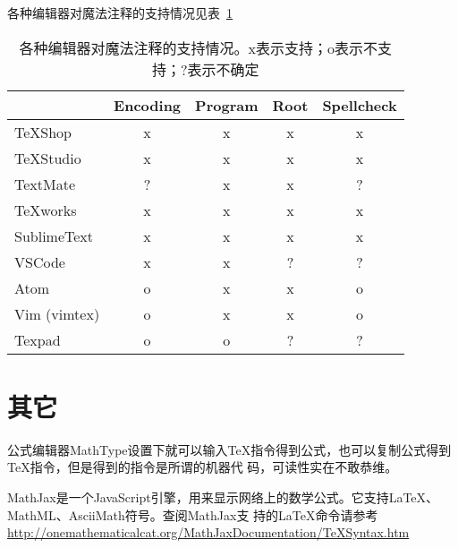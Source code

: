 各种编辑器对魔法注释的支持情况见表~\ref{magiccommands}
\begin{table}
  \centering
  \caption{各种编辑器对魔法注释的支持情况。x表示支持；o表示不支持；?表示不确定}\label{magiccommands}
  \begin{tabular}{|l|*{4}{c|}}
    \hline
    & Encoding & Program & Root & Spellcheck \\
    \hline
    TeXShop & x  & x & x & x \\
    \hline
    TeXStudio & x & x & x & x \\
    \hline
    TextMate & ? & x & x & ? \\
    \hline
    TeXworks & x & x & x & x \\
    \hline
    SublimeText  & x & x & x & x \\ 
    \hline
    VSCode & x & x & ? & ? \\
    \hline
    Atom & o & x & x & o \\
    \hline
    Vim
    (vimtex) & o & x & x & o \\ 
    \hline
    Texpad & o & o & ? & ? \\
    \hline
  \end{tabular}
\end{table}

\section{其它}




公式编辑器MathType设置下就可以输入TeX指令得到公式，也可以复制公式得到TeX指令，但是得到的指令是所谓的机器代
码，可读性实在不敢恭维。

MathJax是一个JavaScript引擎，用来显示网络上的数学公式。它支持LaTeX、MathML、AsciiMath符号。查阅MathJax支
持的LaTeX命令请参考\url{http://onemathematicalcat.org/MathJaxDocumentation/TeXSyntax.htm}